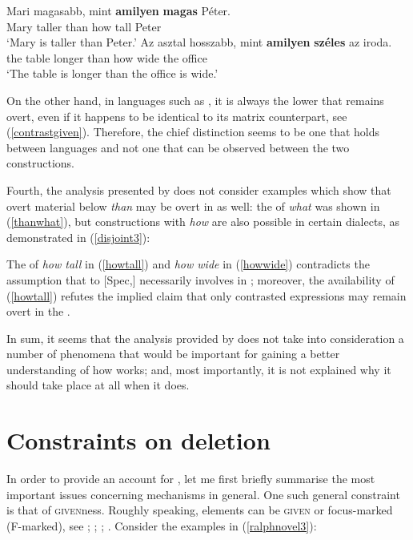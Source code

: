 \ea \label{maritaller3}
\ea \gll Mari	magasabb,	mint \textbf{amilyen} \textbf{magas} P\'eter.\\
Mary taller	than how tall	Peter\\
\glt `Mary is taller than Peter.'
\ex \gll	Az asztal hosszabb,	mint \textbf{amilyen} \textbf{széles}	az iroda.\\
the	table	longer than	how	wide the office\\
\glt `The table is longer than the office is wide.'
\z
\z

On the other hand, in languages such as , it is always the lower  that remains overt, even if it happens to be identical to its matrix  counterpart, see (\ref{contrastgiven}). Therefore, the chief distinction seems to be one that holds between languages and not one that can be observed between the two constructions.

Fourth, the analysis presented by \citet{kennedy2002} does not consider examples which show that overt material below \textit{than} may be overt in  as well: the  of \textit{what} was shown in (\ref{thanwhat}), but constructions with \textit{how} are also possible in certain dialects, as demonstrated in (\ref{disjoint3}):

\ea \label{how3}
 \label{howtall}
 \label{howwide}
\z
\z

The  of \textit{how tall} in (\ref{howtall}) and \textit{how wide} in (\ref{howwide}) contradicts the assumption that  to [Spec,] necessarily involves  in ; moreover, the availability of (\ref{howtall}) refutes the implied claim that only contrasted  expressions may remain overt in the .

In sum, it seems that the analysis provided by \citet{kennedy2002} does not take into consideration a number of phenomena that would be important for gaining a better understanding of how  works; and, most importantly, it is not explained why it should take place at all when it does.

\section{Constraints on deletion} \label{sec:3constraints}
In order to provide an account for , let me first briefly summarise the most important issues concerning  mechanisms in general. One such general constraint is that of \textsc{given}ness. Roughly speaking, elements can be \textsc{given} or focus-marked (F-marked), see \citet{selkirk1996, selkirk2005}; \citet{schwarzschild1999}; \citet{merchant2001}; \citet{buering2006}. Consider the examples in (\ref{ralphnovel3}):

